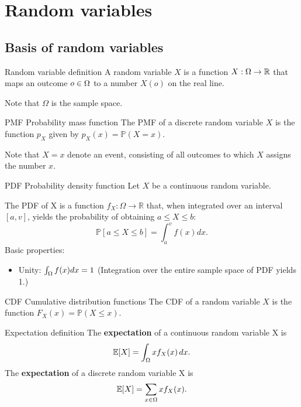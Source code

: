 \section{Random variables}

\subsection{Basis of random variables}

\begin{fact}{Random variable definition}{}
  A random variable $X$ is a function $X:\Omega\rightarrow\mathbb{R}$ that maps an outcome $o\in\Omega$ to a number $X(o)$ on the real line.

  Note that $\Omega$ is the sample space.
\end{fact}

\begin{fact}{PMF \g Probability mass function}{}
    The PMF of a discrete random variable $X$ is the function $p_X$ given by $p_X(x) = \mathbb{P}(X=x)$.

    Note that $X=x$ denote an event, consisting of all outcomes to which $X$ assigns the number $x$.
\end{fact}

\begin{fact}{PDF \g Probability density function}{}
  Let $X$ be a continuous random variable.

  The PDF of X is a function $f_X\mathbin{:}\Omega\rightarrow\mathbb{R}$ that, when integrated
  over an interval $[a,v]$, yields the probability of obtaining $a\le X \le b$:
  \begin{equation*}
    \mathbb{P}[a\le X \le b] = \int_{a}^{v}f(x)dx.
  \end{equation*}
  Basic properties:
  \begin{itemize}
    \item Unity: $\int_\Omega f(x)dx=1$ (Integration over the entire sample space of PDF yields 1.)
  \end{itemize}
\end{fact}

\begin{fact}{CDF \g Cumulative distribution functions}{}
    The CDF of a random variable $X$ is the function $F_X(x)=\mathbb{P}(X\le x)$.
\end{fact}

\begin{fact}{Expectation definition}{}
    The \textbf{expectation} of a continuous random variable X is
    \begin{equation*}
        \mathbb{E}[X] = \int_{\Omega}xf_X(x)\,dx.
    \end{equation*}
    The \textbf{expectation} of a discrete random variable X is
    \begin{equation*}
        \mathbb{E}[X]=\sum_{x\in \Omega}x f_X(x).
    \end{equation*}
\end{fact}

